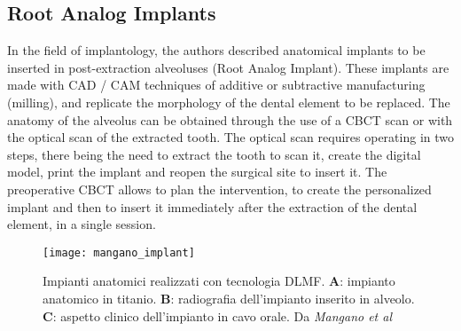 \subsection{Root Analog Implants}
In the field of implantology, the authors described anatomical implants to be inserted in post-extraction alveoluses (Root Analog Implant). These implants are made with CAD / CAM techniques of additive or subtractive manufacturing (milling), and replicate the morphology of the dental element to be replaced. The anatomy of the alveolus can be obtained through the use of a CBCT scan or with the optical scan of the extracted tooth. The optical scan requires operating in two steps, there being the need to extract the tooth to scan it, create the digital model, print the implant and reopen the surgical site to insert it. The preoperative CBCT allows to plan the intervention, to create the personalized implant and then to insert it immediately after the extraction of the dental element, in a single session.
\begin{figure}[h]
\vspace{-10pt}
	\begin{center}
	\texttt{[image: mangano\_implant]}
    \caption{Impianti anatomici realizzati con tecnologia DLMF. \textbf{A}: impianto anatomico in titanio. \textbf{B}: radiografia dell'impianto inserito in alveolo. \textbf{C}: aspetto clinico dell'impianto in cavo orale. Da \emph{Mangano et al} \parencite{Reference84}}
    \label{fig:mangano_implant}
    \end{center}
\vspace{-20pt}
\end{figure}

